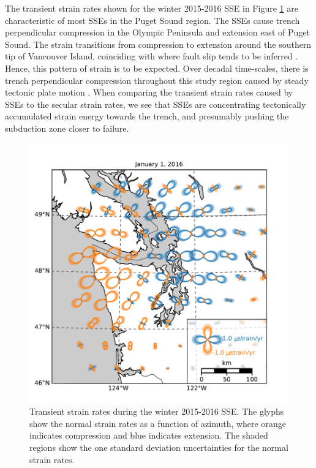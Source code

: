 \documentclass[extra,mreferee]{gji}
\begin{document}

The transient strain rates shown for the winter 2015-2016 SSE in
Figure \ref{fig:StrainMap} are characteristic of most SSEs in the
Puget Sound region. The SSEs cause trench perpendicular compression in
the Olympic Peninsula and extension east of Puget Sound. The strain
transitions from compression to extension around the southern tip of
Vancouver Island, coinciding with where fault slip tends to be
inferred \citep[e.g.,][]{Dragert2001, Wech2009, Schmidt2010}. Hence,
this pattern of strain is to be expected. Over decadal time-scales,
there is trench perpendicular compression throughout this study region
caused by steady tectonic plate motion \citep{Murray2000,
McCaffrey2007, McCaffrey2013}. When comparing the transient strain
rates caused by SSEs to the secular strain rates, we see that SSEs are
concentrating tectonically accumulated strain energy towards the
trench, and presumably pushing the subduction zone closer to failure.

\begin{figure}
\includegraphics{figures/strain_map/strain-map.pdf}
\caption{
Transient strain rates during the winter 2015-2016 SSE. The glyphs
show the normal strain rates as a function of azimuth, where orange
indicates compression and blue indicates extension. The shaded regions
show the one standard deviation uncertainties for the normal strain
rates.
}   
\label{fig:StrainMap}
\end{figure}
\end{document}
